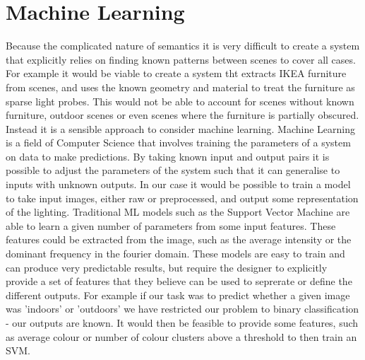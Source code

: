 \documentclass[ %
                    author={Gavin Parker},
                supervisor={Dr. Neill Campbell},
                    degree={MEng},
                     title={Deep Siamese Networks for Illumination Estimation from Stereo Images},
                  subtitle={},
                      type={research},
                      year={2018} ]{dissertation}
\begin{document}
\section{Machine Learning}
Because the complicated nature of semantics it is very difficult to create a system that explicitly relies on finding known patterns between scenes to cover all cases. For example it would be viable to create a system tht extracts IKEA furniture from scenes, and uses the known geometry and material to treat the furniture as sparse light probes. This would not be able to account for scenes without known furniture, outdoor scenes or even scenes where the furniture is partially obscured. Instead it is a sensible approach to consider machine learning. Machine Learning is a field of Computer Science that involves training the parameters of a system on data to make predictions. By taking known input and output pairs it is possible to adjust the parameters of the system such that it can generalise to inputs with unknown outputs. In our case it would be possible to train a model to take input images, either raw or preprocessed, and output some representation of the lighting. Traditional ML models such as the Support Vector Machine are able to learn a given number of parameters from some input features. These features could be extracted from the image, such as the average intensity or the dominant frequency in the fourier domain. These models are easy to train and can produce very predictable results, but require the designer to explicitly provide a set of features that they believe can be used to seprerate or define the different outputs. For example if our task was to predict whether a given image was 'indoors' or 'outdoors' we have restricted our problem to binary classification - our outputs are known. It would then be feasible to provide some features, such as average colour or number of colour clusters above a threshold to then train an SVM.
\newline
\end{document}

